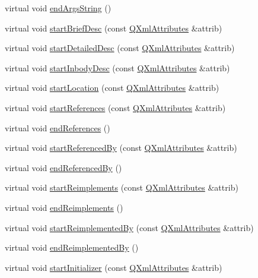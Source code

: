 \begin{DoxyCompactItemize}
\item 
virtual void \hyperlink{class_member_handler_a4473738c1be083b63b6f6695c7487a71}{end\+Args\+String} ()
\item 
virtual void \hyperlink{class_member_handler_a53b51de75e642fc36a8f1d22a5bf0f75}{start\+Brief\+Desc} (const \hyperlink{class_q_xml_attributes}{Q\+Xml\+Attributes} \&attrib)
\item 
virtual void \hyperlink{class_member_handler_a30d5acaa77423be754a33c9f3895ae19}{start\+Detailed\+Desc} (const \hyperlink{class_q_xml_attributes}{Q\+Xml\+Attributes} \&attrib)
\item 
virtual void \hyperlink{class_member_handler_a05149ac563ad8f9ea682e35d41d7ebc7}{start\+Inbody\+Desc} (const \hyperlink{class_q_xml_attributes}{Q\+Xml\+Attributes} \&attrib)
\item 
virtual void \hyperlink{class_member_handler_ac68169d60ab0111a719e7f3a71c9c346}{start\+Location} (const \hyperlink{class_q_xml_attributes}{Q\+Xml\+Attributes} \&attrib)
\item 
virtual void \hyperlink{class_member_handler_aeccae0921031f5ec6c17dc5f33c0bb52}{start\+References} (const \hyperlink{class_q_xml_attributes}{Q\+Xml\+Attributes} \&attrib)
\item 
virtual void \hyperlink{class_member_handler_aed73fc9ee9b52644d194481529401020}{end\+References} ()
\item 
virtual void \hyperlink{class_member_handler_a49b02da000b253dcc64b785dbdc800de}{start\+Referenced\+By} (const \hyperlink{class_q_xml_attributes}{Q\+Xml\+Attributes} \&attrib)
\item 
virtual void \hyperlink{class_member_handler_ae5d1c054c01f753e64ecd7f4c933d565}{end\+Referenced\+By} ()
\item 
virtual void \hyperlink{class_member_handler_a41e9ad55b9eef3b7ce631b639538e2b8}{start\+Reimplements} (const \hyperlink{class_q_xml_attributes}{Q\+Xml\+Attributes} \&attrib)
\item 
virtual void \hyperlink{class_member_handler_a0c6b38a50a32be808b8b8d17ebbee0f4}{end\+Reimplements} ()
\item 
virtual void \hyperlink{class_member_handler_a2c069ebfd4d78463b4a6158ec36b605e}{start\+Reimplemented\+By} (const \hyperlink{class_q_xml_attributes}{Q\+Xml\+Attributes} \&attrib)
\item 
virtual void \hyperlink{class_member_handler_adee54201328cb06c72c1d613ecf3daab}{end\+Reimplemented\+By} ()
\item 
virtual void \hyperlink{class_member_handler_a4bc1ca8945014fb5ff5b2199717c234e}{start\+Initializer} (const \hyperlink{class_q_xml_attributes}{Q\+Xml\+Attributes} \&attrib)

\end{DoxyCompactItemize}

